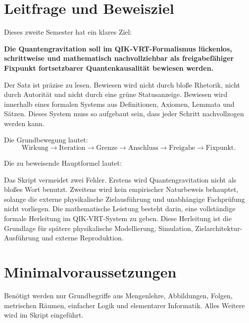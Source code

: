 \documentclass[11pt,a4paper,oneside]{scrartcl}
\theoremstyle{qikstyle}
\newenvironment{merksatz}{\begin{center}\begin{minipage}{0.92\linewidth}\sffamily\bfseries}{\end{minipage}\end{center}}
\begin{document}
\newpage
\tableofcontents
\newpage

\section{Leitfrage und Beweisziel}

Dieses zweite Semester hat ein klares Ziel:

\begin{merksatz}
Die Quantengravitation soll im QIK-VRT-Formalismus lückenlos, schrittweise und mathematisch nachvollziehbar als freigabefähiger Fixpunkt fortsetzbarer Quantenkausalität bewiesen werden.
\end{merksatz}

Der Satz ist präzise zu lesen. Bewiesen wird nicht durch bloße Rhetorik, nicht durch Autorität und nicht durch eine grüne Statusanzeige. Bewiesen wird innerhalb eines formalen Systems aus Definitionen, Axiomen, Lemmata und Sätzen. Dieses System muss so aufgebaut sein, dass jeder Schritt nachvollzogen werden kann.

Die Grundbewegung lautet:
\[
\text{Wirkung} \longrightarrow \text{Iteration} \longrightarrow \text{Grenze} \longrightarrow \text{Anschluss} \longrightarrow \text{Freigabe} \longrightarrow \text{Fixpunkt}.
\]

Die zu beweisende Hauptformel lautet:
\begin{center}
\end{center}

Das Skript vermeidet zwei Fehler. Erstens wird Quantengravitation nicht als bloßes Wort benutzt. Zweitens wird kein empirischer Naturbeweis behauptet, solange die externe physikalische Zielausführung und unabhängige Fachprüfung nicht vorliegen. Die mathematische Leistung besteht darin, eine vollständige formale Herleitung im QIK-VRT-System zu geben. Diese Herleitung ist die Grundlage für spätere physikalische Modellierung, Simulation, Zielarchitektur-Ausführung und externe Reproduktion.

\section{Minimalvoraussetzungen}

Benötigt werden nur Grundbegriffe aus Mengenlehre, Abbildungen, Folgen, metrischen Räumen, einfacher Logik und elementarer Informatik. Alles Weitere wird im Skript eingeführt.
\end{document}
